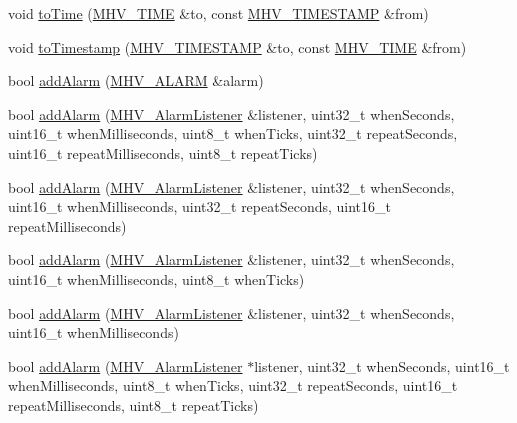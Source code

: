 \begin{DoxyCompactItemize}
void \hyperlink{class_m_h_v___r_t_c_aa0a908785e5445b1ab5d3bdb20f5fc62}{to\-Time} (\hyperlink{_m_h_v___r_t_c_8h_adace8912943ac21c837360427880df71}{\-M\-H\-V\-\_\-\-T\-I\-M\-E} \&to, const \hyperlink{_m_h_v___r_t_c_8h_a1e30d3a92b1b868286bd0d619245d8a6}{\-M\-H\-V\-\_\-\-T\-I\-M\-E\-S\-T\-A\-M\-P} \&from)
\item 
void \hyperlink{class_m_h_v___r_t_c_a3aecb460c309ca773933e0c82bbd7819}{to\-Timestamp} (\hyperlink{_m_h_v___r_t_c_8h_a1e30d3a92b1b868286bd0d619245d8a6}{\-M\-H\-V\-\_\-\-T\-I\-M\-E\-S\-T\-A\-M\-P} \&to, const \hyperlink{_m_h_v___r_t_c_8h_adace8912943ac21c837360427880df71}{\-M\-H\-V\-\_\-\-T\-I\-M\-E} \&from)
\item 
bool \hyperlink{class_m_h_v___r_t_c_ac58061c6f016d665a9027f8d55b9d5c0}{add\-Alarm} (\hyperlink{_m_h_v___r_t_c_8h_af13307658f41fba330ffae04dd5cbce6}{\-M\-H\-V\-\_\-\-A\-L\-A\-R\-M} \&alarm)
\item 
bool \hyperlink{class_m_h_v___r_t_c_a3e8a1a5a2b302997025c9b28f104c9f7}{add\-Alarm} (\hyperlink{class_m_h_v___alarm_listener}{\-M\-H\-V\-\_\-\-Alarm\-Listener} \&listener, uint32\-\_\-t when\-Seconds, uint16\-\_\-t when\-Milliseconds, uint8\-\_\-t when\-Ticks, uint32\-\_\-t repeat\-Seconds, uint16\-\_\-t repeat\-Milliseconds, uint8\-\_\-t repeat\-Ticks)
\item 
bool \hyperlink{class_m_h_v___r_t_c_ab3b8f4a19caf565bdf85ba863c07a801}{add\-Alarm} (\hyperlink{class_m_h_v___alarm_listener}{\-M\-H\-V\-\_\-\-Alarm\-Listener} \&listener, uint32\-\_\-t when\-Seconds, uint16\-\_\-t when\-Milliseconds, uint32\-\_\-t repeat\-Seconds, uint16\-\_\-t repeat\-Milliseconds)
\item 
bool \hyperlink{class_m_h_v___r_t_c_a0ce5325c293c19525ad25bfa372b4b49}{add\-Alarm} (\hyperlink{class_m_h_v___alarm_listener}{\-M\-H\-V\-\_\-\-Alarm\-Listener} \&listener, uint32\-\_\-t when\-Seconds, uint16\-\_\-t when\-Milliseconds, uint8\-\_\-t when\-Ticks)
\item 
bool \hyperlink{class_m_h_v___r_t_c_ac5a3dadf50236eb3034eeac887a9317e}{add\-Alarm} (\hyperlink{class_m_h_v___alarm_listener}{\-M\-H\-V\-\_\-\-Alarm\-Listener} \&listener, uint32\-\_\-t when\-Seconds, uint16\-\_\-t when\-Milliseconds)
\item 
bool \hyperlink{class_m_h_v___r_t_c_ac2dac753e3931ff1bc82f70aef5017ce}{add\-Alarm} (\hyperlink{class_m_h_v___alarm_listener}{\-M\-H\-V\-\_\-\-Alarm\-Listener} $\ast$listener, uint32\-\_\-t when\-Seconds, uint16\-\_\-t when\-Milliseconds, uint8\-\_\-t when\-Ticks, uint32\-\_\-t repeat\-Seconds, uint16\-\_\-t repeat\-Milliseconds, uint8\-\_\-t repeat\-Ticks)

\end{DoxyCompactItemize}
